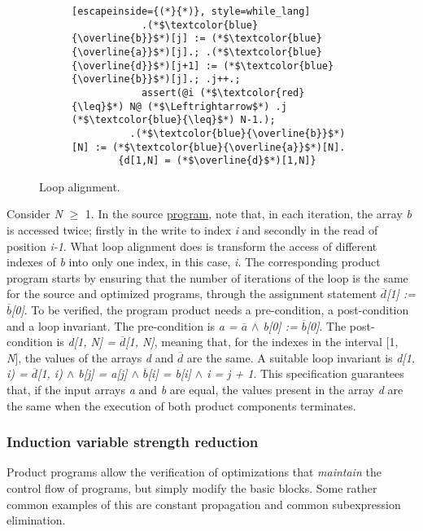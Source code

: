 \begin{figure}
\begin{subfigure}[b]{0.9\textwidth}
\begin{minipage}[t]{\linewidth}
\begin{lstlisting}[escapeinside={(*}{*)}, style=while_lang]
            .(*$\textcolor{blue}{\overline{b}}$*)[j] := (*$\textcolor{blue}{\overline{a}}$*)[j].; .(*$\textcolor{blue}{\overline{d}}$*)[j+1] := (*$\textcolor{blue}{\overline{b}}$*)[j].; .j++.;
            assert(@i (*$\textcolor{red}{\leq}$*) N@ (*$\Leftrightarrow$*) .j (*$\textcolor{blue}{\leq}$*) N-1.);
          .(*$\textcolor{blue}{\overline{b}}$*)[N] := (*$\textcolor{blue}{\overline{a}}$*)[N].
        {d[1,N] = (*$\overline{d}$*)[1,N]}
      \end{lstlisting}
    \end{minipage}
  \end{subfigure}
  \caption{Loop alignment.}
  \label{fig:loop_alignment}
\end{figure}

Consider \emph{N} $\geq$ 1.
In the source \hyperref[fig:loop_alignment]{program}, note that, in each iteration, the array \emph{b} is accessed twice; firstly in the write to index \emph{i} and secondly in the read of position \emph{i-1}.
What loop alignment does is transform the access of different indexes of \emph{b} into only one index, in this case, \emph{i}.
The corresponding product program starts by ensuring that the number of iterations of the loop is the same for the source and optimized programs, through the assignment statement \emph{$\overline{d}$[1] := $\overline{b}$[0]}.
To be verified, the program product needs a pre-condition, a post-condition and a loop invariant.
The pre-condition is \emph{a = $\overline{a}$ $\land$ b[0] := $\overline{b}$[0]}.
The post-condition is \emph{d[1, N] = $\overline{d}$[1, N]}, meaning that, for the indexes in the interval [1, \emph{N}], the values of the arrays \emph{d} and \emph{$\overline{d}$} are the same.
A suitable loop invariant is \emph{d[1, i) = $\overline{d}$[1, i)  $\land$  b[j] = a[j]  $\land$  $\overline{b}$[i] = b[i]  $\land$  i = j + 1}.
This specification guarantees that, if the input arrays \emph{a} and \emph{b} are equal, the values present in the array \emph{d} are the same when the execution of both product components terminates.

\FloatBarrier
\subsubsection{Induction variable strength reduction} 
\label{subsubsec:product_programs_strength_reduction}

Product programs allow the verification of optimizations that \emph{maintain} the control flow of programs, but simply modify the basic blocks.
Some rather common examples of this are constant propagation and common subexpression elimination.


